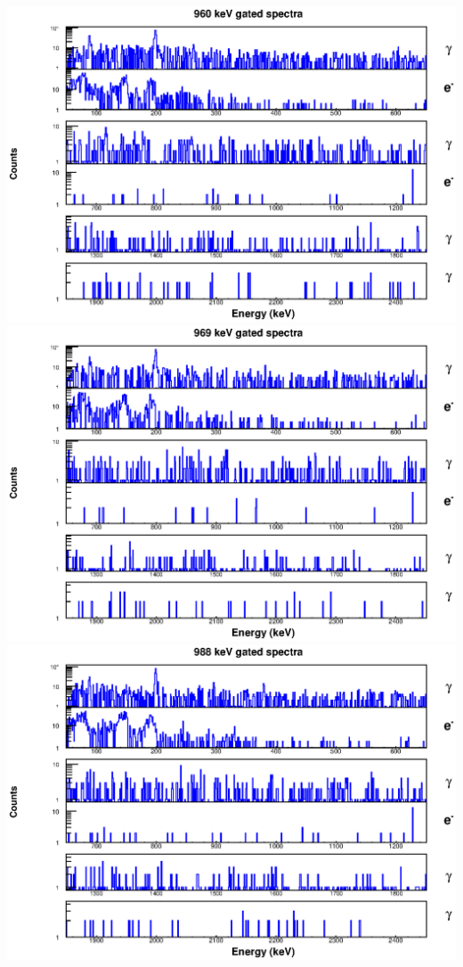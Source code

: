 \includegraphics[scale=0.8]{156Gd_Appendix/960_combined.eps}
\includegraphics[scale=0.8]{156Gd_Appendix/969_combined.eps}
\includegraphics[scale=0.8]{156Gd_Appendix/988_combined.eps}
